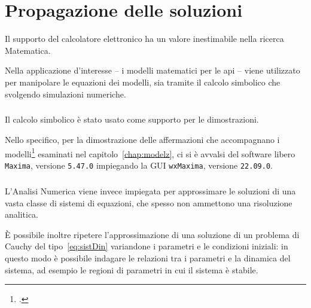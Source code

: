 \chapter{Propagazione delle soluzioni}
Il supporto del calcolatore elettronico ha un valore inestimabile nella ricerca Matematica.

Nella applicazione d'interesse -- i modelli matematici per le api -- viene utilizzato
per manipolare le equazioni dei modelli, sia tramite il calcolo simbolico che svolgendo simulazioni numeriche.

\paragraph{}
Il calcolo simbolico è stato usato come supporto per le dimostrazioni.

Nello specifico, per la dimostrazione delle affermazioni che accompagnano i modelli\footcite{khoury2011,ratti2017}
esaminati nel capitolo~\ref{chap:modelz}, ci si è avvalsi del software libero \texttt{Maxima},
versione \texttt{5.47.0} impiegando la GUI \texttt{wxMaxima}, versione \texttt{22.09.0}.

\paragraph{}
L'Analisi Numerica viene invece impiegata per approssimare le soluzioni di una vasta classe di sistemi di equazioni,
che spesso non ammettono una risoluzione analitica.

È possibile inoltre ripetere l'approssimazione di una soluzione di un problema di Cauchy del tipo~\eqref{eq:sistDin}
variandone i parametri e le condizioni iniziali: in questo modo è possibile indagare le relazioni tra i parametri e
la dinamica del sistema, ad esempio le regioni di parametri in cui il sistema è stabile.

